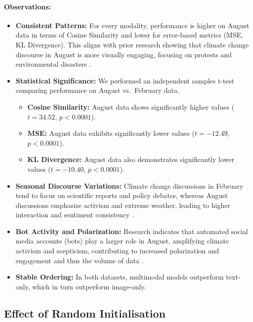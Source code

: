 \paragraph{Observations:}
\begin{itemize}
    \item \textbf{Consistent Patterns:} For every modality, performance is higher on August data in terms of Cosine Similarity and lower for error-based metrics (MSE, KL Divergence). This aligns with prior research showing that climate change discourse in August is more visually engaging, focusing on protests and environmental disasters \cite{mooseder_social_2023}.
    \item \textbf{Statistical Significance:} We performed an independent samples t-test comparing performance on August vs.\ February data. 
    \begin{itemize}
    \item \textbf{Cosine Similarity:} August data shows significantly higher values ($t = 34.52$, $p < 0.0001$).
    \item \textbf{MSE:} August data exhibits significantly lower values ($t = -12.49$, $p < 0.0001$).
    \item \textbf{KL Divergence:} August data also demonstrates significantly lower values ($t = -10.40$, $p < 0.0001$).
    \end{itemize}
    \item \textbf{Seasonal Discourse Variations:} Climate change discussions in February tend to focus on scientific reports and policy debates, whereas August discussions emphasize activism and extreme weather, leading to higher interaction and sentiment consistency \cite{mooseder_social_2023}.
    \item \textbf{Bot Activity and Polarization:} Research indicates that automated social media accounts (bots) play a larger role in August, amplifying climate activism and scepticism, contributing to increased polarization and engagement and thus the volume of data \cite{mooseder_social_2023}.
    \item \textbf{Stable Ordering:} In both datasets, multimodal models outperform text-only, which in turn outperform image-only.
\end{itemize}



\subsection{Effect of Random Initialisation}
\label{subsec:results_seeds}

